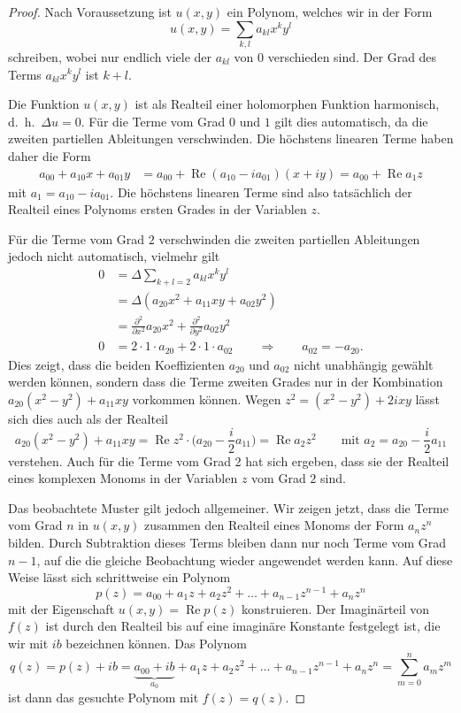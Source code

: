 \begin{proof}
Nach Voraussetzung ist $u(x,y)$ ein Polynom, welches wir in der Form
\[
u(x,y)
=
\sum_{k,l}
a_{kl} x^ky^l
\]
schreiben, wobei nur endlich viele der $a_{kl}$ von $0$ verschieden
sind.
Der Grad des Terms $a_{kl}x^ky^l$ ist $k+l$. 

Die Funktion $u(x,y)$ ist als Realteil einer holomorphen Funktion
harmonisch, d.~h.~$\Delta u=0$.
Für die Terme vom Grad $0$ und $1$ gilt dies automatisch, da die
zweiten partiellen Ableitungen verschwinden.
Die höchstens linearen Terme haben daher die Form
\begin{align*}
a_{00} + a_{10}x + a_{01}y
&=
a_{00} + \operatorname{Re} (a_{10}-ia_{01})(x+iy)
=
a_{00} + \operatorname{Re} a_1z
\end{align*}
mit $a_1=a_{10}-ia_{01}$.
Die höchstens linearen Terme sind also tatsächlich der Realteil eines
Polynoms ersten Grades in der Variablen $z$.

Für die Terme vom Grad $2$ verschwinden die zweiten partiellen 
Ableitungen jedoch nicht automatisch, vielmehr gilt
\begin{align*}
0
&=
\Delta
\sum_{k+l=2} a_{kl}x^ky^l
\\
&=
\Delta (a_{20}x^2 + a_{11}xy + a_{02}y^2)
\\
&=
\frac{\partial^2}{\partial x^2}
a_{20}x^2
+
\frac{\partial^2}{\partial y^2}
a_{02}y^2
\\
0
&=
2\cdot 1\cdot a_{20}  + 2 \cdot 1 \cdot a_{02}
\qquad\Rightarrow\qquad a_{02}=-a_{20}.
\end{align*}
Dies zeigt, dass die beiden Koeffizienten $a_{20}$ und $a_{02}$ nicht
unabhängig gewählt werden können, sondern dass die Terme zweiten
Grades nur in der Kombination
\(
a_{20}(x^2-y^2) + a_{11}xy
\)
vorkommen können.
Wegen
\(
z^2
=
(x^2-y^2) + 2ixy
\)
lässt sich dies auch als der Realteil 
\[
a_{20}(x^2-y^2) + a_{11}xy
=
\operatorname{Re} z^2\cdot \biggl(a_{20}-\frac{i}2a_{11}\biggr)
=
\operatorname{Re} a_2z^2
\qquad\text{mit $a_2=a_{20}-\displaystyle\frac{i}2a_{11}$}
\]
verstehen.
Auch für die Terme vom Grad 2 hat sich ergeben, dass sie der Realteil
eines komplexen Monoms in der Variablen $z$ vom Grad $2$ sind.

Das beobachtete Muster gilt jedoch allgemeiner.
Wir zeigen jetzt, dass die Terme vom Grad $n$ in $u(x,y)$ zusammen
den Realteil eines Monoms der Form $a_nz^n$ bilden.
Durch Subtraktion dieses Terms bleiben dann nur noch Terme vom Grad $n-1$,
auf die die gleiche Beobachtung wieder angewendet werden kann.
Auf diese Weise lässt sich schrittweise ein Polynom
\[
p(z)
=
a_{00} + a_1z + a_2z^2 + \dots + a_{n-1}z^{n-1} + a_nz^n
\]
mit
der Eigenschaft $u(x,y)=\operatorname{Re}p(z)$ konstruieren.
Der Imaginärteil von $f(z)$ ist durch den Realteil bis auf eine imaginäre
Konstante festgelegt ist, die wir mit $ib$ bezeichnen können.
Das Polynom
\[
q(z)
=
p(z)+ib
=
\underbrace{a_{00}+ib}_{\displaystyle a_0}
+ a_1z + a_2z^2 + \dots + a_{n-1}z^{n-1} + a_nz^n
=
\sum_{m=0}^n a_mz^m
\]
ist dann das gesuchte Polynom mit $f(z)=q(z)$.


\end{proof}
